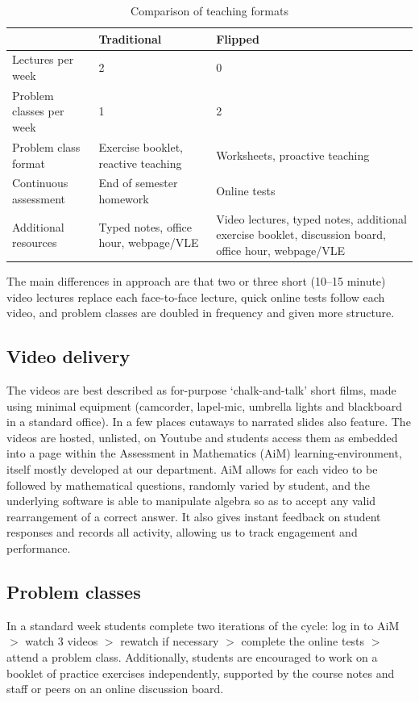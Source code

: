 \documentclass{amsart}
\begin{document}
\begin{table}[htb]
\begin{tabularx}{0.8\textwidth}{lXX}
 & Traditional & Flipped\\\hline
Lectures per week & 2 & 0\\
Problem classes per week & 1 & 2\\
Problem class format & Exercise booklet, reactive teaching & Worksheets, proactive teaching\\
Continuous assessment & End of semester homework & Online tests\\
Additional resources & Typed notes, office hour, webpage/VLE & Video lectures, typed notes, additional exercise booklet, discussion board, office hour, webpage/VLE
\end{tabularx}
\caption{Comparison of teaching formats}
\end{table}

The main differences in approach are that two or three short (10--15 minute) video lectures replace each face-to-face lecture, quick online tests follow each video, and problem classes are doubled in frequency and given more structure.

\subsection{Video delivery}

The videos are best described as for-purpose `chalk-and-talk' short films, made using minimal equipment (camcorder, lapel-mic, umbrella lights and blackboard in a standard office).  In a few places cutaways to narrated slides also feature.  The videos are hosted, unlisted, on Youtube and students access them as embedded into a page within the Assessment in Mathematics (AiM) learning-environment, itself mostly developed at our department.  AiM allows for each video to be followed by mathematical questions, randomly varied by student, and the underlying software is able to manipulate algebra so as to accept any valid rearrangement of a correct answer. It also gives instant feedback on student responses and records all activity, allowing us to track engagement and performance.

\subsection{Problem classes}

In a standard week students complete two iterations of the cycle: log in to AiM $>$ watch 3 videos $>$ rewatch if necessary $>$ complete the online tests $>$ attend a problem class. Additionally, students are encouraged to work on a booklet of practice exercises independently, supported by the course notes and staff or peers on an online discussion board.
\end{document}
